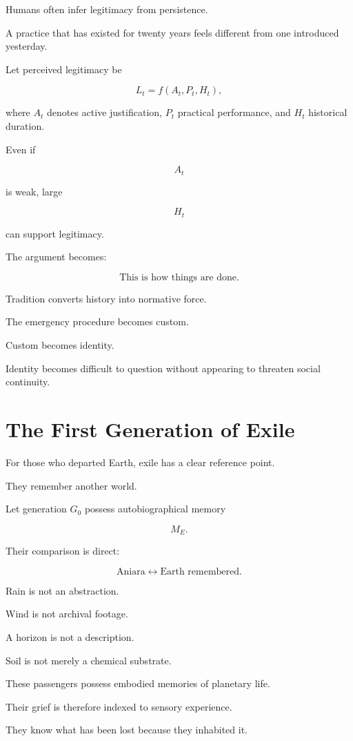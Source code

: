 \documentclass[11pt,oneside]{book}
\theoremstyle{definition}
\theoremstyle{remark}
\begin{document}
Humans often infer legitimacy from persistence.

A practice that has existed for twenty years feels different from one introduced yesterday.

Let perceived legitimacy be

\[
L_t
=
f(A_t,P_t,H_t),
\]

where \(A_t\) denotes active justification, \(P_t\) practical performance, and \(H_t\) historical duration.

Even if

\[
A_t
\]

is weak, large

\[
H_t
\]

can support legitimacy.

The argument becomes:

\[
\text{This is how things are done.}
\]

Tradition converts history into normative force.

The emergency procedure becomes custom.

Custom becomes identity.

Identity becomes difficult to question without appearing to threaten social continuity.

\section{The First Generation of Exile}

For those who departed Earth, exile has a clear reference point.

They remember another world.

Let generation \(G_0\) possess autobiographical memory

\[
M_E.
\]

Their comparison is direct:

\[
\text{Aniara}
\leftrightarrow
\text{Earth remembered}.
\]

Rain is not an abstraction.

Wind is not archival footage.

A horizon is not a description.

Soil is not merely a chemical substrate.

These passengers possess embodied memories of planetary life.

Their grief is therefore indexed to sensory experience.

They know what has been lost because they inhabited it.
\end{document}
